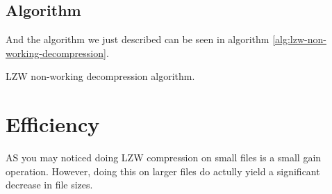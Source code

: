 \begin{refsection}
\subsection{Algorithm}

And the algorithm we just described can be seen in algorithm
\ref{alg:lzw-non-working-decompression}.

\begin{algorithm}[H]
  \caption{LZW non-working decompression algorithm.}
  \label{alg:lzw-non-working-decompression}
  \begin{algorithmic}[1]
    \State {}


      \State {}

      \State {}


    \EndWhile
  \end{algorithmic}
\end{algorithm}

\section{Efficiency}

AS you may noticed doing LZW compression on small files is a small
gain operation. However, doing this on larger files do actully yield a
significant decrease in file sizes.

\FloatBarrier

\printbibliography[heading=subbibliography]

\end{refsection}
